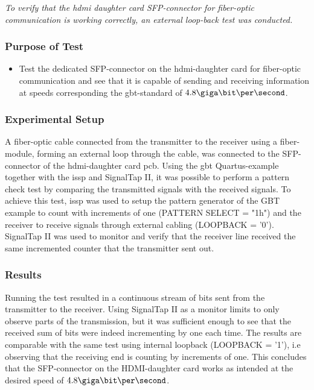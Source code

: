 \documentclass[main.tex]{subfiles}
\begin{document}
\textit{To verify that the \gls{hdmi} daughter card SFP-connector for fiber-optic communication is working correctly, an external loop-back test was conducted.}

\subsubsection{Purpose of Test}
\begin{itemize}\setlength{\itemsep}{10pt}

\item Test the dedicated SFP-connector on the \gls{hdmi}-daughter card for fiber-optic communication and see that it is capable of sending and receiving information at speeds corresponding the \gls{gbt}-standard of $4.8 \giga\bit\per\second$. 
\end{itemize}

\subsubsection{Experimental Setup}
A fiber-optic cable connected from the transmitter to the receiver using a fiber-module, forming an external loop through the cable, was connected to the SFP-connector of the \gls{hdmi}-daughter card \gls{pcb}. Using the \gls{gbt} Quartus-example together with the \gls{issp} and SignalTap II, it was possible to perform a pattern check test by comparing the transmitted signals with the received signals. To achieve this test, \gls{issp} was used to setup the pattern generator of the GBT example to count with increments of one (PATTERN SELECT = "1h") and the receiver to receive signals through external cabling (LOOPBACK = '0'). SignalTap II was used to monitor and verify that the receiver line received the same incremented counter that the transmitter sent out.

\subsubsection{Results}
Running the test resulted in a continuous stream of bits sent from the transmitter to the receiver. Using SignalTap II as a monitor limits to only observe parts of the transmission, but it was sufficient enough to see that the received sum of bits were indeed incrementing by one each time. The results are comparable with the same test using internal loopback (LOOPBACK = '1'), i.e observing that the receiving end is counting by increments of one. This concludes that the SFP-connector on the HDMI-daughter card works as intended at the desired speed of $4.8 \giga\bit\per\second$. %
\end{document}
